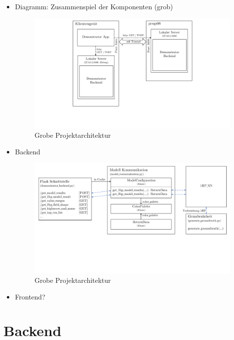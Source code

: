 \documentclass[a4paper]{extarticle}
\begin{document}
    \begin{itemize}
        \item Diagramm: Zusammenspiel der Komponenten (grob)
        \begin{figure}[H]
            \centering
            \includegraphics[trim={5cm 3.5cm 5cm 0}, clip, width=0.8\linewidth]{architektur_projekt.pdf}
            \caption{Grobe Projektarchitektur} \label{fig:architektur-projekt}
        \end{figure}
        \item Backend
        \begin{figure}[H]
            \centering
            \includegraphics[trim={0cm 6cm 0cm 0}, clip, width=\linewidth]{architektur_backend.pdf}
            \caption{Grobe Projektarchitektur} \label{fig:architektur-backend}
        \end{figure}
        \item Frontend?
    \end{itemize}

    \section{Backend}
\end{document}
